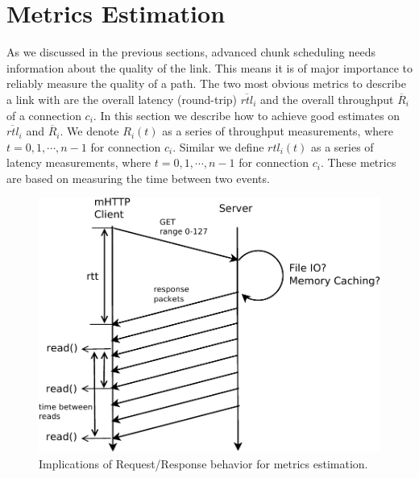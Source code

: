 \section{Metrics Estimation}
\label{sec:metrics}
As we discussed in the previous sections, advanced chunk scheduling needs information about the quality of the link. 
This means it is of major importance to reliably measure the quality of a path.
The two most obvious metrics to describe a link with are the overall latency (round-trip) $\overline{rtl}_i$ and the overall throughput $\overline{R}_i$ of a connection $c_i$. 
In this section we describe how to achieve good estimates on $\overline{rtl}_i$ and $\overline{R}_i$. 
We denote $R_i(t)$ as a series of throughput measurements, where $t=0,1,\cdots,n-1$ for connection $c_i$. 
Similar we define $rtl_i(t)$ as a series of latency measurements, where $t=0,1,\cdots,n-1$ for connection $c_i$.
These metrics are based on measuring the time between two events. 


\begin{figure}[t]
        \begin{center}
			\includegraphics[width=0.7\linewidth]{Figures/scheduler-metrics}
        \end{center}
        \caption{Implications of Request/Response behavior for metrics estimation.}
		\label{fig:metrics}
  \vspace*{-0.3cm}
\end{figure}

